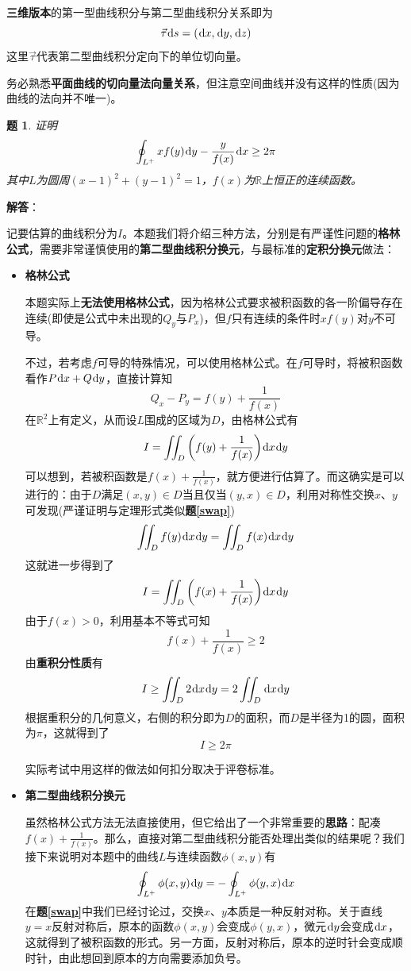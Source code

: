 \documentclass[a4paper,UTF8,fontset=windows,AutoFakeBold]{ctexart}
\newcommand*{\dr}{\hspace{0.07em}\mathrm{d}}
\newcommand*{\rb}{\mathbb{R}}
\newcommand*{\note}{\noindent *}
\theoremstyle{ex}
\newtheorem{exercise}{题}
\newcommand{\exref}[1]{\textbf{题\;\ref{#1}\;}}
\newcommand{\sol}[1]{{\vspace{5pt}\kaishu\noindent\textbf{解答}：\vspace{-3pt}
\begin{compactitem}
    \item[] #1
\end{compactitem}
}}
\begin{document}
\note \textbf{三维版本}的第一型曲线积分与第二型曲线积分关系即为
$$\vec\tau\dr s=(\dr x,\dr y,\dr z)$$
这里$\vec\tau$代表第二型曲线积分定向下的单位切向量。

\note 务必熟悉\textbf{平面曲线的切向量法向量关系}，但注意空间曲线并没有这样的性质(因为曲线的法向并不唯一)。

\begin{framed}
\begin{exercise}\label{type 2 symm}
    证明
    $$\oint_{L^+}xf(y)\dr y-\frac{y}{f(x)}\dr x\ge2\pi$$
    其中$L$为圆周$(x-1)^2+(y-1)^2=1$，$f(x)$为$\rb$上恒正的连续函数。
\end{exercise}
\sol{
    记要估算的曲线积分为$I$。本题我们将介绍三种方法，分别是有严谨性问题的\textbf{格林公式}，需要非常谨慎使用的\textbf{第二型曲线积分换元}，与最标准的\textbf{定积分换元}做法：
    \begin{itemize}
        \item \textbf{格林公式}
        
        本题实际上\textbf{无法使用格林公式}，因为格林公式要求被积函数的各一阶偏导存在连续(即使是公式中未出现的$Q_y$与$P_x$)，但$f$只有连续的条件时$xf(y)$对$y$不可导。

        不过，若考虑$f$可导的特殊情况，可以使用格林公式。在$f$可导时，将被积函数看作$P\dr x+Q\dr y$，直接计算知
        $$Q_x-P_y=f(y)+\frac{1}{f(x)}$$
        在$\rb^2$上有定义，从而设$L$围成的区域为$D$，由格林公式有
        $$I=\iint_D\bigg(f(y)+\frac{1}{f(x)}\bigg)\dr x\dr y$$
        可以想到，若被积函数是$f(x)+\frac{1}{f(x)}$，就方便进行估算了。而这确实是可以进行的：由于$D$满足$(x,y)\in D$当且仅当$(y,x)\in D$，利用对称性交换$x$、$y$可发现(严谨证明与定理形式类似\exref{swap})
        $$\iint_Df(y)\dr x\dr y=\iint_Df(x)\dr x\dr y$$
        这就进一步得到了
        $$I=\iint_D\bigg(f(x)+\frac{1}{f(x)}\bigg)\dr x\dr y$$
        由于$f(x)>0$，利用基本不等式可知
        $$f(x)+\frac{1}{f(x)}\ge2$$
        由\textbf{重积分性质}有
        $$I\ge\iint_D2\dr x\dr y=2\iint_D\dr x\dr y$$
        根据重积分的几何意义，右侧的积分即为$D$的面积，而$D$是半径为1的圆，面积为$\pi$，这就得到了
        $$I\ge2\pi$$

        \note 实际考试中用这样的做法如何扣分取决于评卷标准。
        
        \item \textbf{第二型曲线积分换元}
        
        虽然格林公式方法无法直接使用，但它给出了一个非常重要的\textbf{思路}：配凑$f(x)+\frac{1}{f(x)}$。那么，直接对第二型曲线积分能否处理出类似的结果呢？我们接下来说明对本题中的曲线$L$与连续函数$\phi(x,y)$有
        $$\oint_{L^+}\phi(x,y)\dr y=-\oint_{L^+}\phi(y,x)\dr x$$
        在\exref{swap}中我们已经讨论过，交换$x$、$y$本质是一种反射对称。关于直线$y=x$反射对称后，原本的函数$\phi(x,y)$会变成$\phi(y,x)$，微元$\dr y$会变成$\dr x$，这就得到了被积函数的形式。另一方面，反射对称后，原本的逆时针会变成顺时针，由此想回到原本的方向需要添加负号。


\end{itemize}}
\end{framed}
\end{document}
